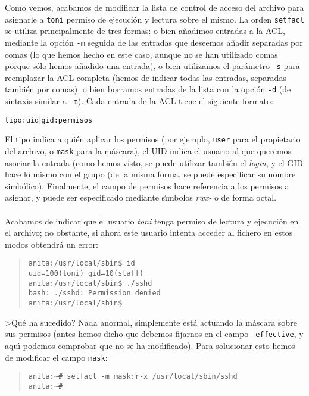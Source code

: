 Como vemos, acabamos de modificar la lista de control de acceso del archivo
para asignarle a {\tt toni} permiso de ejecuci\'on y lectura sobre el mismo. La
orden {\tt setfacl} se utiliza principalmente de tres formas: o bien a\~nadimos
entradas a la ACL, mediante la opci\'on {\tt -m} seguida de las entradas que 
deseemos a\~nadir separadas por comas (lo que hemos hecho en este caso, aunque
no se han utilizado comas porque s\'olo hemos a\~nadido una entrada), o bien 
utilizamos el par\'ametro {\tt -s} para reemplazar la ACL completa (hemos de 
indicar todas las entradas, separadas tambi\'en por comas), o bien borramos
entradas de la lista con la opci\'on {\tt -d} (de sintaxis similar a {\tt -m}).
Cada entrada de la ACL tiene el siguiente formato:
\begin{center}
{\large {\tt tipo:{\sc uid}$\mid${\sc gid}:permisos}}
\end{center}
El tipo indica a qui\'en aplicar los permisos (por ejemplo, {\tt user} para
el propietario del archivo, o {\tt mask} para la m\'ascara), el UID indica el
usuario al que queremos asociar la entrada (como hemos visto, se puede utilizar
tambi\'en el {\it login}, y el GID hace lo mismo con el grupo (de la misma 
forma, se puede especificar su nombre simb\'olico). Finalmente, el campo de
permisos hace referencia a los permisos a asignar, y puede ser especificado 
mediante s\'{\i}mbolos {\it rwx-} o de forma octal.\\
\\Acabamos de indicar que el usuario {\it toni} tenga permiso de lectura y
ejecuci\'on en el archivo; no obstante, si ahora este usuario intenta acceder 
al fichero en estos modos obtendr\'a un error:
\begin{quote}
\begin{verbatim}
anita:/usr/local/sbin$ id
uid=100(toni) gid=10(staff)
anita:/usr/local/sbin$ ./sshd
bash: ./sshd: Permission denied
anita:/usr/local/sbin$ 
\end{verbatim}
\end{quote}
>Qu\'e ha sucedido? Nada anormal, simplemente est\'a actuando la m\'ascara sobre
sus permisos (antes hemos dicho que debemos fijarnos en el campo {\tt 
effective}, y aqu\'{\i} podemos comprobar que no se ha modificado). Para 
solucionar esto hemos de modificar el campo {\tt mask}:
\begin{quote}
\begin{verbatim}
anita:~# setfacl -m mask:r-x /usr/local/sbin/sshd
anita:~#
\end{verbatim}
\end{quote}

